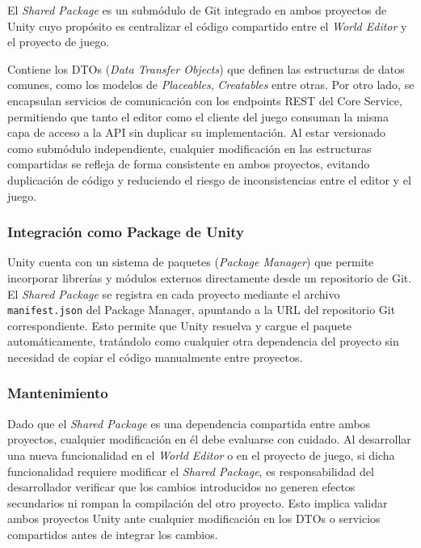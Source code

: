 El \textit{Shared Package} es un submódulo de Git integrado en ambos proyectos de Unity cuyo propósito es
centralizar el código compartido entre el \textit{World Editor} y el proyecto de juego. 

\vspace{0.25cm}

Contiene los DTOs (\textit{Data Transfer Objects}) que definen las estructuras de datos comunes, como los modelos de
\textit{Placeables}, \textit{Creatables} entre otras. Por otro lado, se encapsulan servicios de comunicación
con los endpoints REST del Core Service, permitiendo que tanto el editor como el cliente del juego
consuman la misma capa de acceso a la API sin duplicar su implementación. Al estar versionado como
submódulo independiente, cualquier modificación en las estructuras compartidas se refleja de forma
consistente en ambos proyectos, evitando duplicación de código y reduciendo el riesgo de inconsistencias
entre el editor y el juego.

\subsubsection{Integración como Package de Unity}

Unity cuenta con un sistema de paquetes (\textit{Package Manager}) que permite incorporar librerías y
módulos externos directamente desde un repositorio de Git. El \textit{Shared Package} se registra en
cada proyecto mediante el archivo \texttt{manifest.json} del Package Manager, apuntando a la URL del
repositorio Git correspondiente. Esto permite que Unity resuelva y cargue el paquete automáticamente,
tratándolo como cualquier otra dependencia del proyecto sin necesidad de copiar el código manualmente
entre proyectos.

\subsubsection{Mantenimiento}
Dado que el \textit{Shared Package} es una dependencia compartida entre ambos proyectos, cualquier
modificación en él debe evaluarse con cuidado. Al desarrollar una nueva funcionalidad en el \textit{World Editor}
o en el proyecto de juego, si dicha funcionalidad requiere modificar el \textit{Shared Package}, es
responsabilidad del desarrollador verificar que los cambios introducidos no generen efectos secundarios
ni rompan la compilación del otro proyecto. Esto implica validar ambos proyectos Unity ante cualquier
modificación en los DTOs o servicios compartidos antes de integrar los cambios.
